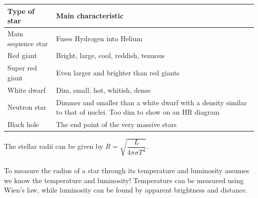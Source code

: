 \begin{center}
\begin{tabularx}{\textwidth}{@{}|Y |Y |@{}}
\toprule
\textbf{Type of star} & \textbf{Main characteristic}\\
\midrule
Main sequence star & Fuses Hydrogen into Helium \\
\midrule
Red giant & Bright, large, cool, reddish, tenuous\\
\midrule
Super red giant & Even larger and brighter than red giants\\
\midrule
White dwarf & Dim, small, hot, whitish, dense\\
\midrule
Neutron star & Dimmer and smaller than a white dwarf with a density similar to that of nuclei. Too dim to show on an HR diagram\\
\midrule
Black hole & The end point of the very massive stars\\
\bottomrule
\end{tabularx}
\end{center}
The stellar radii can be given by $R=\sqrt{\dfrac{L}{4\pi\sigma T^4}}$.\\\\
To measure the radius of a star through its temperature and luminosity assumes we know the temperature and luminosity! Temperature can be measured using Wien's law, while luminosity can be found by apparent brightness and distance. 
